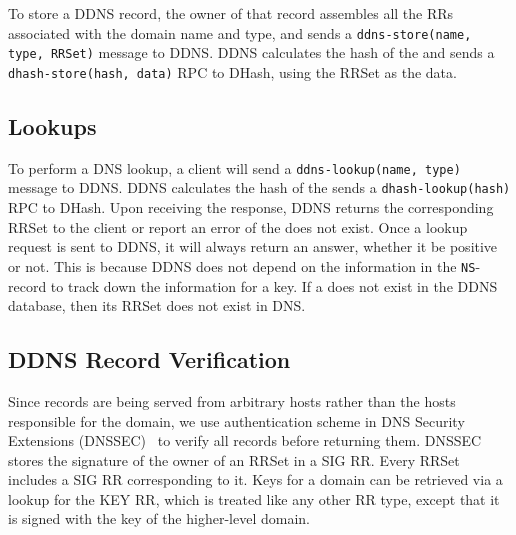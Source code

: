To store a DDNS record, the owner of that record 
assembles all the RRs associated with the domain name and type,
and sends a {\tt ddns-store(name, type, RRSet)} message to DDNS. 
DDNS calculates the hash of the {\tt <domain name, type>} and sends
a {\tt dhash-store(hash, data)} RPC to DHash, using the
RRSet as the data.

\subsection{Lookups}

To perform a DNS lookup, a client will send a 
{\tt ddns-lookup(name, type)} message to {DDNS}.
DDNS 
calculates the hash of the {\tt <domain name, type>} sends a
{\tt dhash-lookup(hash)} RPC to DHash. Upon receiving
the response, DDNS returns the corresponding RRSet to the 
client or report an error of the {\tt <domain name, type>} does 
not exist. Once a lookup request is sent to DDNS, it will 
always return an answer, whether it be positive or not. 
This is because DDNS does not depend on the information 
in the {\tt NS}-record to track down the information for a key.
If a {\tt <domain name, type>} does not exist in the DDNS database,
then its RRSet does not exist in DNS.

\subsection{DDNS Record Verification}

Since records are being served from arbitrary hosts rather
than the hosts responsible for the domain, 
we use authentication scheme in 
DNS Security Extensions (DNSSEC)~\cite{dnssec:rfc} to
verify all records before returning them. DNSSEC stores the 
signature of the owner of an RRSet in a SIG RR. Every RRSet
includes a SIG RR corresponding to it. Keys for a domain can 
be retrieved via a lookup for the KEY RR, which is treated 
like any other RR type, except that it is signed with the 
key of the higher-level domain.
 
